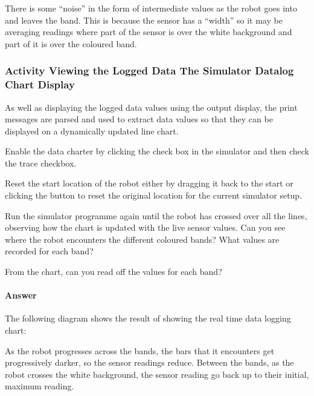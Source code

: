 \documentclass[letterpaper,10pt,english]{sphinxmanual}
\begin{document}
There is some “noise” in the form of intermediate values as the robot goes into and leaves the band. This is because the sensor has a “width” so it may be averaging readings where part of the sensor is over the white background and part of it is over the coloured band.


\subsubsection{Activity \sphinxhyphen{} Viewing the Logged Data \sphinxhyphen{} The Simulator Datalog Chart Display}
\label{\detokenize{content/00_SOFTWARE_GUIDE/Section_00_03_quick_practical_tour:Activity---Viewing-the-Logged-Data---The-Simulator-Datalog-Chart-Display}}
As well as displaying the logged data values using the output display, the print messages are parsed and used to extract data values so that they can be displayed on a dynamically updated line chart.

Enable the data charter by clicking the  check box in the simulator and then check the  trace checkbox.


Reset the start location of the robot either by dragging it back to the start or clicking the  button to reset the original location for the current simulator setup.

Run the simulator programme again until the robot has crossed over all the lines, observing how the chart is updated with the live sensor values. Can you see where the robot encounters the different coloured bands? What values are recorded for each band?

From the chart, can you read off the values for each band?


\paragraph{Answer}
\label{\detokenize{content/00_SOFTWARE_GUIDE/Section_00_03_quick_practical_tour:id1}}

The following diagram shows the result of showing the real time data logging chart:

As the robot progresses across the bands, the bars that it encounters get progressively darker, so the sensor readings reduce. Between the bands, as the robot crosses the white background, the sensor reading go back up to their initial, maximum reading.
\end{document}
